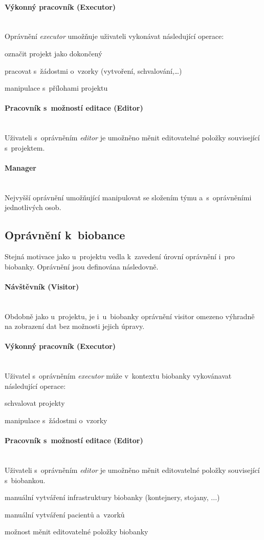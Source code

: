 \documentclass[11pt, draft, oneside]{fithesis2}
\newcommand{\paragraphNewLine}[1]{\paragraph*{#1}\mbox{}\\}
\begin{document}
\paragraphNewLine{Výkonný pracovník (Executor)} 
Oprávnění \textit{executor} umožňuje uživateli vykonávat následující operace:
\begin{compactitem}
	\item označit projekt jako dokončený
	\item pracovat s~žádostmi o~vzorky (vytvoření, schvalování,\ldots)
	\item manipulace s~přílohami projektu
\end{compactitem}

\paragraphNewLine{Pracovník s~možností editace (Editor)}
Uživateli s~oprávněním \textit{editor} je umožněno měnit editovatelné položky související s~projektem.

\paragraphNewLine{Manager}
Nejvyšší oprávnění umožňující manipulovat se složením týmu a~s~oprávněními jednotlivých osob.

\subsection{Oprávnění k~biobance}
Stejná motivace jako u~projektu vedla k~zavedení úrovní oprávnění i~pro biobanky. Oprávnění jsou definována následovně. 

\paragraphNewLine{Návštěvník (Visitor)} 
Obdobně jako u~projektu, je i~u~biobanky oprávnění visitor omezeno výhradně na zobrazení dat bez možnosti jejich úpravy. 

\paragraphNewLine{Výkonný pracovník (Executor)}
Uživatel s~oprávněním \textit{executor} může v~kontextu biobanky vykovánavat následující operace:
\begin{compactitem}
	\item schvalovat projekty
	\item manipulace s~žádostmi o~vzorky
\end{compactitem}

\paragraphNewLine{Pracovník s~možností editace (Editor)} 
Uživateli s~oprávněním \textit{editor} je umožněno měnit editovatelné položky související s~biobankou.
\begin{compactitem}
	\item manuální vytváření infrastruktury biobanky (kontejnery, stojany, ...)
	\item manuální vytváření pacientů a~vzorků
	\item možnost měnit editovatelné položky biobanky
\end{compactitem}
\end{document}
